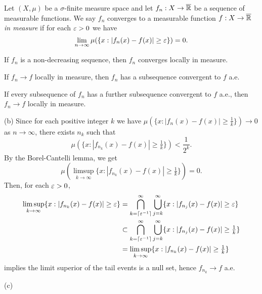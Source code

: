 \documentclass{../../large}
\begin{document}
\begin{prb}
Let $(X,\mu)$ be a $\sigma$-finite measure space and let $f_n:X\to\overline{\mathbb{R}}$ be a sequence of measurable functions.
We say $f_n$ converges to a measurable function $f:X\to\overline{\mathbb{R}}$ \emph{in measure} if for each $\varepsilon>0$ we have
\[\lim_{n\to\infty}\mu(\{x:|f_n(x)-f(x)|\ge\varepsilon\})=0.\]
\begin{parts}
\item If $f_n$ is a non-decreasing sequence, then $f_n$ converges locally in measure.
\item If $f_n\to f$ locally in measure, then $f_n$ has a subsequence convergent to $f$ a.e.
\item If every subsequence of $f_n$ has a further subsequence convergent to $f$ a.e., then $f_n\to f$ locally in measure.
\end{parts}
\end{prb}
\begin{pf}
(b)
Since for each positive integer $k$ we have $\mu(\{x:|f_n(x)-f(x)|\ge\frac1k\})\to0$ as $n\to\infty$, there exists $n_k$ such that
\[\mu(\{x:|f_{n_k}(x)-f(x)|\ge\tfrac1k\})<\frac1{2^k}.\]
By the Borel-Cantelli lemma, we get
\[\mu(\limsup_{k\to\infty}\{x:|f_{n_k}(x)-f(x)|\ge\tfrac1k\})=0.\]
Then, for each $\varepsilon>0$,
\begin{align*}
\limsup_{k\to\infty}\{x:|f_{n_k}(x)-f(x)|\ge\varepsilon\}
&=\bigcap_{k=\lceil\varepsilon^{-1}\rceil}^\infty\bigcup_{j=k}^\infty\{x:|f_{n_j}(x)-f(x)|\ge\varepsilon\}\\
&\subset\bigcap_{k=\lceil\varepsilon^{-1}\rceil}^\infty\bigcup_{j=k}^\infty\{x:|f_{n_j}(x)-f(x)|\ge\tfrac1k\}\\
&=\limsup_{k\to\infty}\{x:|f_{n_k}(x)-f(x)|\ge\tfrac1k\}
\end{align*}
implies the limit superior of the tail events is a null set, hence $f_{n_k}\to f$ a.e.

(c)
\end{pf}
\end{document}
